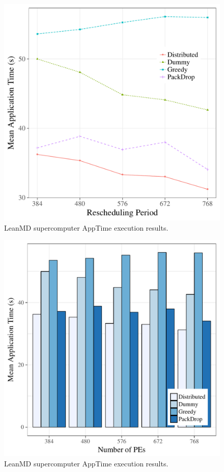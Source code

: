 \begin{figure}[!ht]
 \centering
 \includegraphics[width=0.9\linewidth]{images/apptime_leanmd_sdumont.pdf}
 \caption{LeanMD supercomputer AppTime execution results.}
 \label{fig:eval:sdumont:leanmd:apptime}
\end{figure}

\begin{figure}[!ht]
 \centering
 \includegraphics[width=0.9\linewidth]{images/apptime_leanmd_sdumont_bars.pdf}
 \caption{LeanMD supercomputer AppTime execution results.}
 \label{fig:eval:sdumont:leanmd:apptime:bars}
\end{figure}

